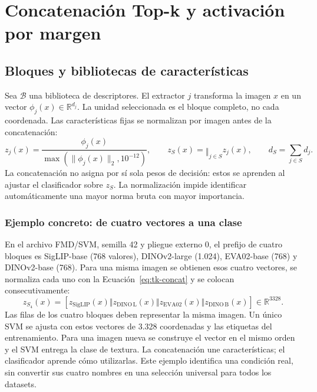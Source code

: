 \chapter{Concatenación Top-k y activación por margen}\label{sec:metodo}

\section{Bloques y bibliotecas de características}
Sea \(\mathcal B\) una biblioteca de descriptores. El extractor \(j\) transforma la imagen \(x\) en un vector \(\phi_j(x)\in\mathbb R^{d_j}\). La unidad seleccionada es el bloque completo, no cada coordenada. Las características fijas se normalizan por imagen antes de la concatenación:
\begin{equation}
z_j(x)=\frac{\phi_j(x)}{\max(\|\phi_j(x)\|_2,10^{-12})},\qquad
z_S(x)=\mathop{\Vert}_{j\in S} z_j(x),\qquad d_S=\sum_{j\in S}d_j.
\label{eq:tk-concat}
\end{equation}
La concatenación no asigna por sí sola pesos de decisión: estos se aprenden al ajustar el clasificador sobre \(z_S\). La normalización impide identificar automáticamente una mayor norma bruta con mayor importancia.

\subsection{Ejemplo concreto: de cuatro vectores a una clase}
En el archivo FMD/SVM, semilla 42 y pliegue externo 0, el prefijo de cuatro bloques es SigLIP-base (768 valores), DINOv2-large (1.024), EVA02-base (768) y DINOv2-base (768). Para una misma imagen se obtienen esos cuatro vectores, se normaliza cada uno con la Ecuación~\ref{eq:tk-concat} y se colocan consecutivamente:
\begin{equation}
z_{S_4}(x)=[z_{\mathrm{SigLIP}}(x)\Vert z_{\mathrm{DINO\,L}}(x)
\Vert z_{\mathrm{EVA02}}(x)\Vert z_{\mathrm{DINO\,B}}(x)]
\in\mathbb R^{3328}.
\end{equation}
Las filas de los cuatro bloques deben representar la misma imagen. Un único SVM se ajusta con estos vectores de 3.328 coordenadas y las etiquetas del entrenamiento. Para una imagen nueva se construye el vector en el mismo orden y el SVM entrega la clase de textura. La concatenación une características; el clasificador aprende cómo utilizarlas. Este ejemplo identifica una condición real, sin convertir sus cuatro nombres en una selección universal para todos los datasets.

